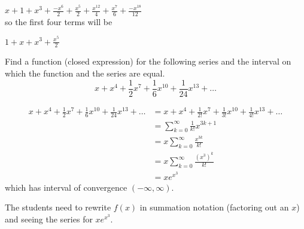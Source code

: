 \documentclass[noinstructornotes]{ximera}
\begin{document}
\begin{problem}
\begin {freeResponse}
$x + 1 + x^{3} + \frac{-x^{6}}{2} + \frac{x^{5}}{2} + \frac{x^{12}}{4}
+ \frac{x^{7}}{6} + \frac{- x^{18}}{12}$ \\

so the first four terms will be

$\boxed{1 + x + x^{3} + \frac{x^{5}}{2}}$

\end{freeResponse}


\end{problem}



\begin{problem}
Find a function (closed expression) for the following series and the interval on which the function and the series are equal.
	\[
	x + x^4 + \frac{1}{2} x^7 + \frac{1}{6} x^{10} + \frac{1}{24} x^{13} + \hdots
	\]
	\begin{freeResponse}
		\begin{align*}
		x + x^4 + \frac{1}{2} x^7 + \frac{1}{6} x^{10} + \frac{1}{24} x^{13} + \hdots
		&= x + x^4 + \frac{1}{2!} x^7 + \frac{1}{3!} x^{10} + \frac{1}{4!} x^{13} + \hdots  \\
		&= \sum_{k=0}^\infty \frac{1}{k!}x^{3k + 1}  \\
		&= x \sum_{k=0}^\infty \frac{x^{3k}}{k!}  \\
		&= x \sum_{k=0}^\infty \frac{(x^3)^k}{k!}  \\
		&= \boxed{xe^{x^3}}
		\end{align*}
	which has interval of convergence $(- \infty, \infty)$.  
	\end{freeResponse}
		
\end{problem}

\begin{instructorNotes}
The students need to rewrite $f(x)$ in summation notation (factoring out an $x$) and seeing the series for $xe^{x^3}$.  
\end{instructorNotes}
\end{document}
